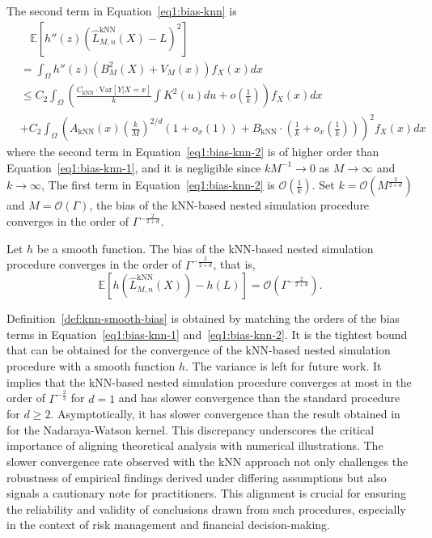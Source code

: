 The second term in Equation~\ref{eq1:bias-knn} is 
\begin{align} \label{eq1:bias-knn-2}
    & ~~~~ \mathbb{E} \left[ h''(z) \left( \hat{L}^{\text{kNN}}_{M, n}(X) - L \right)^2 \right]  \nonumber \\
    & = \int_{\Omega} h''(z) \left(B_M^2(X) + V_M(x)\right) f_X(x) dx \nonumber \\
    & \leq C_2 \int_{\Omega} \left( \frac{C_{\text{kNN}} \cdot \text{Var}[Y| X = x]}{k} \int K^2(u) du + o\left(\frac{1}{k}\right) \right) f_X(x) dx \nonumber \\
    & + C_2 \int_{\Omega} \left( A_{\text{kNN}}(x) \left(\frac{k}{M}\right)^{2/d} \left(1+o_x(1)\right) + B_{\text{kNN}} \cdot \left(\frac{1}{k} + o_x\left(\frac{1}{k}\right)\right) \right)^2 f_X(x) dx 
\end{align}
where the second term in Equation~\ref{eq1:bias-knn-2} is of higher order than Equation~\ref{eq1:bias-knn-1}, and it is negligible since $kM^{-1} \rightarrow 0$ as $M \rightarrow \infty$ and $k \rightarrow \infty$, 
The first term in Equation~\ref{eq1:bias-knn-2} is $\mathcal{O}\left(\frac{1}{k}\right)$.
Set $k = \mathcal{O}(M^{\frac{2}{2+d}})$ and $M = \mathcal{O}(\Gamma)$, the bias of the kNN-based nested simulation procedure converges in the order of $\Gamma^{-\frac{2}{2+d}}$.

\begin{definition} \label{def:knn-smooth-bias}
    Let $h$ be a smooth function. 
    The bias of the kNN-based nested simulation procedure converges in the order of $\Gamma^{-\frac{2}{2+d}}$, that is,
    $$ \mathbb{E} \left[ h(\hat{L}^{\text{kNN}}_{M, n}(X)) - h(L) \right]  = \mathcal{O}(\Gamma^{-\frac{2}{2+d}}).$$
\end{definition}

Definition~\ref{def:knn-smooth-bias} is obtained by matching the orders of the bias terms in Equation~\ref{eq1:bias-knn-1} and~\ref{eq1:bias-knn-2}.
It is the tightest bound that can be obtained for the convergence of the kNN-based nested simulation procedure with a smooth function $h$.
The variance is left for future work.
It implies that the kNN-based nested simulation procedure converges at most in the order of $\Gamma^{-\frac{2}{3}}$ for $d = 1$ and has slower convergence than the standard procedure for $d \geq 2$.
Asymptotically, it has slower convergence than the result obtained in~\cite{hong2017kernel} for the Nadaraya-Watson kernel.
This discrepancy underscores the critical importance of aligning theoretical analysis with numerical illustrations.
The slower convergence rate observed with the kNN approach not only challenges the robustness of empirical findings derived under differing assumptions but also signals a cautionary note for practitioners. 
This alignment is crucial for ensuring the reliability and validity of conclusions drawn from such procedures, especially in the context of risk management and financial decision-making.

